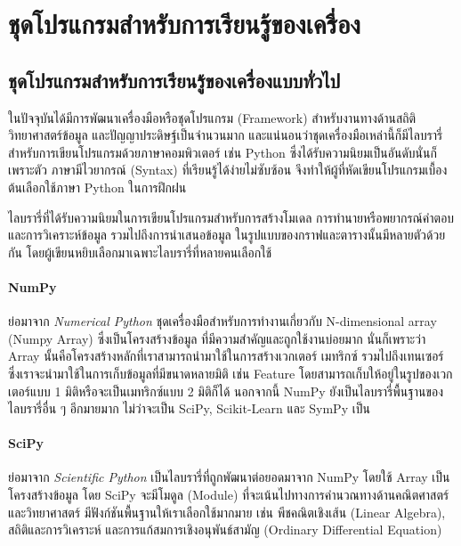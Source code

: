 

\section{ชุดโปรแกรมสำหรับการเรียนรู้ของเครื่อง}
\label{ap:programming}

\subsection{ชุดโปรแกรมสำหรับการเรียนรู้ของเครื่องแบบทั่วไป}

ในปัจจุบันได้มีการพัฒนาเครื่องมือหรือชุดโปรแกรม (Framework) สำหรับงานทางด้านสถิติ วิทยาศาสตร์ข้อมูล และปัญญาประดิษฐ์เป็นจำนวนมาก
และแน่นอนว่าชุดเครื่องมือเหล่านี้ก็มีไลบรารี่สำหรับการเขียนโปรแกรมด้วยภาษาคอมพิวเตอร์ เช่น Python ซึ่งได้รับความนิยมเป็นอันดับนั่นก็เพราะตัว%
ภาษามีไวยากรณ์ (Syntax) ที่เรียนรู้ได้ง่ายไม่ซับซ้อน จึงทำให้ผู้ที่หัดเขียนโปรแกรมเบื้องต้นเลือกใช้ภาษา Python ในการฝึกฝน 

ไลบรารี่ที่ได้รับความนิยมในการเขียนโปรแกรมสำหรับการสร้างโมเดล การทำนายหรือพยากรณ์คำตอบ และการวิเคราะห์ข้อมูล รวมไปถึงการนำเสนอข้อมูล%
ในรูปแบบของกราฟและตารางนั้นมีหลายตัวด้วยกัน โดยผู้เขียนหยิบเลือกมาเฉพาะไลบรารี่ที่หลายคนเลือกใช้

\paragraph{\textbf{NumPy}}
ย่อมาจาก \textit{Numerical Python} ชุดเครื่องมือสำหรับการทำงานเกี่ยวกับ N-dimensional array (Numpy Array) ซึ่งเป็นโครงสร้างข้อมูล%
ที่มีความสำคัญและถูกใช้งานบ่อยมาก นั่นก็เพราะว่า Array นั้นคือโครงสร้างหลักที่เราสามารถนำมาใช้ในการสร้างเวกเตอร์ เมทริกซ์ รวมไปถึงเทนเซอร์
ซึ่งเราจะนำมาใช้ในการเก็บข้อมูลที่มีขนาดหลายมิติ เช่น Feature โดยสามารถเก็บให้อยู่ในรูปของเวกเตอร์แบบ 1 มิติหรือจะเป็นเมทริกซ์แบบ 2 มิติก็ได้
นอกจากนี้ NumPy ยังเป็นไลบรารี่พื้นฐานของไลบรารี่อื่น ๆ อีกมายมาก ไม่ว่าจะเป็น SciPy, Scikit-Learn และ SymPy เป็น

\paragraph{SciPy} 
ย่อมาจาก \textit{Scientific Python} เป็นไลบรารี่ที่ถูกพัฒนาต่อยอดมาจาก NumPy โดยใช้ Array เป็นโครงสร้างข้อมูล
โดย SciPy จะมีโมดูล (Module) ที่จะเน้นไปทางการคำนวณทางด้านคณิตศาสตร์และวิทยาศาสตร์ มีฟังก์ชันพื้นฐานให้เราเลือกใช้มากมาย เช่น 
พีชคณิตเชิงเส้น (Linear Algebra), สถิติและการวิเคราะห์ และการแก้สมการเชิงอนุพันธ์สามัญ (Ordinary Differential Equation)

